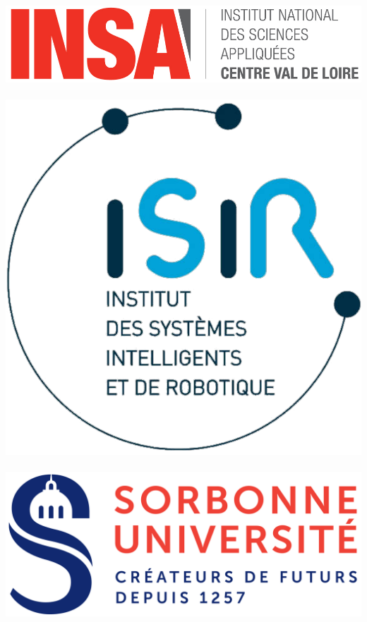 \documentclass[10pt]{report}
\begin{document}
	\large		%
	\sffamily	%
	
	\begin{titlepage}
		\begin{sffamily}
			\begin{center}
				
				\includegraphics[scale=0.25]{insa_cvl_grand_logo.jpg}~	\includegraphics[scale=0.86]{Logo_ISIR.png}~	\includegraphics[scale=0.12]{Logo_officiel_de_Sorbonne_Universite.png}~\\[3cm]
				

\end{center}
\end{sffamily}
\end{titlepage}
\end{document}
